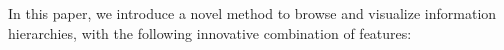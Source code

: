 \documentclass[10pt,psfig]{article}
\begin{document}




In this paper, we introduce a novel method to browse and visualize information hierarchies, with the following innovative combination of features:
\end{document}

